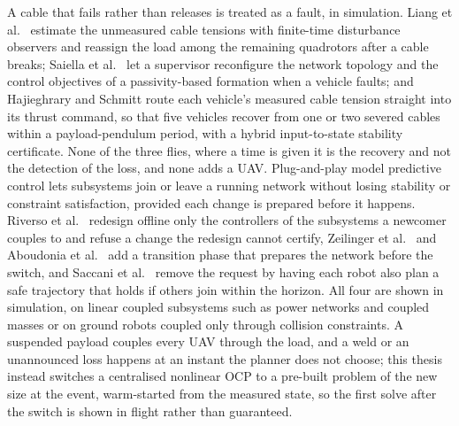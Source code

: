 A cable that fails rather than releases is treated as a fault, in simulation. Liang et al.\ \cite{liang2021fault} estimate the unmeasured cable tensions with finite-time disturbance observers and reassign the load among the remaining quadrotors after a cable breaks; Saiella et al.\ \cite{saiella2021fault} let a supervisor reconfigure the network topology and the control objectives of a passivity-based formation when a vehicle faults; and Hajieghrary and Schmitt \cite{hajieghrary2026passive} route each vehicle's measured cable tension straight into its thrust command, so that five vehicles recover from one or two severed cables within a payload-pendulum period, with a hybrid input-to-state stability certificate. None of the three flies, where a time is given it is the recovery and not the detection of the loss, and none adds a UAV.
Plug-and-play model predictive control lets subsystems join or leave a running network without losing
stability or constraint satisfaction, provided each change is prepared before it happens. Riverso et al.\
\cite{riverso2013plug} redesign offline only the controllers of the subsystems a newcomer couples to and
refuse a change the redesign cannot certify, Zeilinger et al.\ \cite{zeilinger2013plug} and Aboudonia et
al.\ \cite{aboudonia2022reconfigurable} add a transition phase that prepares the network before the switch,
and Saccani et al.\ \cite{saccani2023model} remove the request by having each robot also plan a safe
trajectory that holds if others join within the horizon. All four are shown in simulation, on linear
coupled subsystems such as power networks and coupled masses or on ground robots coupled only through
collision constraints. A suspended payload couples every UAV through the load, and a weld or an unannounced
loss happens at an instant the planner does not choose; this thesis instead switches a centralised
nonlinear OCP to a pre-built problem of the new size at the event, warm-started from the measured state,
so the first solve after the switch is shown in flight rather than guaranteed.

